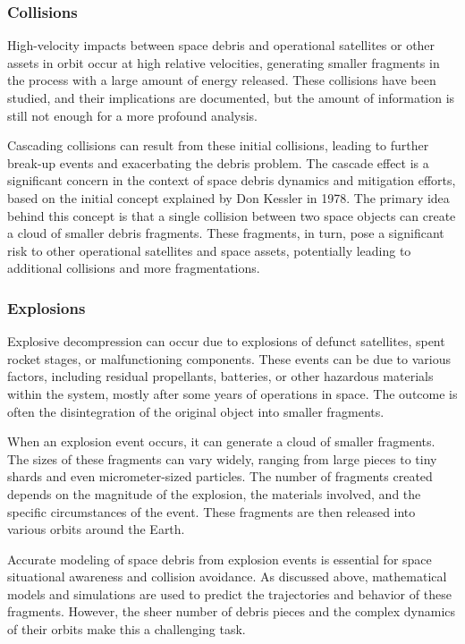 \documentclass[11pt]{article} %
\begin{document}
\subsubsection{Collisions}
High-velocity impacts between space debris and operational satellites or other assets in orbit occur at high relative velocities, generating smaller fragments in the process with a large amount of energy released. These collisions have been studied, and their implications are documented, but the amount of information is still not enough for a more profound analysis.

Cascading collisions can result from these initial collisions, leading to further break-up events and exacerbating the debris problem. The cascade effect is a significant concern in the context of space debris dynamics and mitigation efforts, based on the initial concept explained by Don Kessler in 1978. The primary idea behind this concept is that a single collision between two space objects can create a cloud of smaller debris fragments. These fragments, in turn, pose a significant risk to other operational satellites and space assets, potentially leading to additional collisions and more fragmentations.~\cite{kessler_environment_1985}

\subsubsection{Explosions}
Explosive decompression can occur due to explosions of defunct satellites, spent rocket stages, or malfunctioning components. These events can be due to various factors, including residual propellants, batteries, or other hazardous materials within the system, mostly after some years of operations in space. The outcome is often the disintegration of the original object into smaller fragments.

When an explosion event occurs, it can generate a cloud of smaller fragments. The sizes of these fragments can vary widely, ranging from large pieces to tiny shards and even micrometer-sized particles. The number of fragments created depends on the magnitude of the explosion, the materials involved, and the specific circumstances of the event. These fragments are then released into various orbits around the Earth.

Accurate modeling of space debris from explosion events is essential for space situational awareness and collision avoidance. As discussed above, mathematical models and simulations are used to predict the trajectories and behavior of these fragments. However, the sheer number of debris pieces and the complex dynamics of their orbits make this a challenging task.
\end{document}
